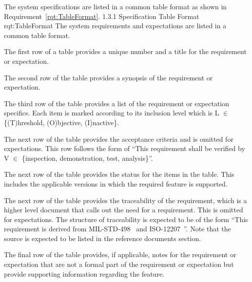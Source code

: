 The system specifications are listed in a common table format as shown in Requirement~\ref{rqt:TableFormat}.
\NRQMT
{1.3.1}
{Specification Table Format}
{rqt:TableFormat}
{The system requirements and expectations are listed in a common table format.}
{\small
 \item The first row of a table provides a unique number and a title for the requirement or expectation.

 \item The second row of the table provides a synopsis of the requirement or expectation.

 \item The third row of the table provides a list of the requirement or expectation specifics. Each item is marked according to its inclusion level which is L $\in$ \{(T)hreshold, (O)bjective, (I)nactive\}.  
 

 \item The next row of the table provides the acceptance criteria and is omitted for expectations. This row follows the form of ``This requirement shall be verified by V $\in$ \{inspection, demonstration, test, analysis\}''.

 \item The next row of the table provides the status for the items in the table. This includes the applicable versions in which the required feature is supported.  

 \item The next row of the table provides the traceability of the requirement, which is a higher level document that calls out the need for a requirement. This is omitted for expectations. The structure of traceability is expected to be of the form ``This requirement is derived from MIL-STD-498~\cite{ref__MIL_STD_498} and ISO-12207~\cite{ref__ISO_12207}''. Note that the source is expected to be listed in the reference documents section.

 \item The final row of the table provides, if applicable, notes for the requirement or expectation that are not a formal part of the requirement or expectation but provide supporting information regarding the feature.
}
